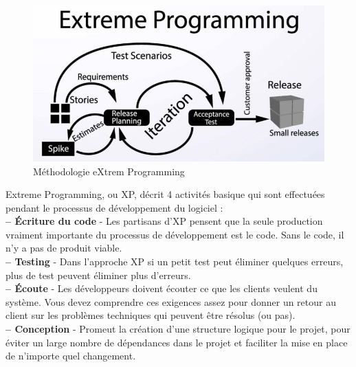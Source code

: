 \documentclass[a4paper, 12pt]{report}
\begin{document}
\begin{itemize}
\begin{figure}[H]
    \centering
    \includegraphics[width = 1\linewidth]{img/xp.jpg}
    \caption{Méthodologie eXtrem Programming}
\end{figure}

Extreme Programming, ou XP, décrit 4 activités basique qui sont effectuées pendant le processus de développement du logiciel : \\
\textbf{-- Écriture du code} - Les partisans d'XP pensent que la seule production vraiment importante du processus de développement est le code. Sans le code, il n'y a pas de produit viable. \\
\textbf{-- Testing} - Dans l'approche XP si un petit test peut éliminer quelques erreurs, plus de test peuvent éliminer plus d'erreurs. \\
\textbf{-- Écoute} - Les développeurs doivent écouter ce que les clients veulent du système. Vous devez comprendre ces exigences assez pour donner un retour au client sur les problèmes techniques qui peuvent être résolus (ou pas). \\
\textbf{-- Conception} - Promeut la création d'une structure logique pour le projet, pour éviter un large nombre de dépendances dans le projet et faciliter la mise en place de n'importe quel changement. 


\end{itemize}
\end{document}
